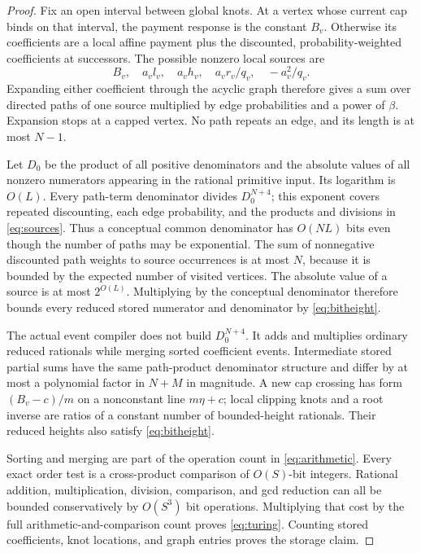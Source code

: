 \begin{proof}
Fix an open interval between global knots. At a vertex whose current cap binds on that interval, the payment response is the constant $B_v$. Otherwise its coefficients are a local affine payment plus the discounted, probability-weighted coefficients at successors. The possible nonzero local sources are
\begin{equation}\label{eq:sources}
 B_v,\quad a_vl_v,\quad a_vh_v,\quad a_vr_v/q_v,\quad -a_v^2/q_v.
\end{equation}
Expanding either coefficient through the acyclic graph therefore gives a sum over directed paths of one source multiplied by edge probabilities and a power of $\beta$. Expansion stops at a capped vertex. No path repeats an edge, and its length is at most $N-1$.

Let $D_0$ be the product of all positive denominators and the absolute values of all nonzero numerators appearing in the rational primitive input. Its logarithm is $O(L)$. Every path-term denominator divides $D_0^{N+4}$; this exponent covers repeated discounting, each edge probability, and the products and divisions in \eqref{eq:sources}. Thus a conceptual common denominator has $O(NL)$ bits even though the number of paths may be exponential. The sum of nonnegative discounted path weights to source occurrences is at most $N$, because it is bounded by the expected number of visited vertices. The absolute value of a source is at most $2^{O(L)}$. Multiplying by the conceptual denominator therefore bounds every reduced stored numerator and denominator by \eqref{eq:bitheight}.

The actual event compiler does not build $D_0^{N+4}$. It adds and multiplies ordinary reduced rationals while merging sorted coefficient events. Intermediate stored partial sums have the same path-product denominator structure and differ by at most a polynomial factor in $N+M$ in magnitude. A new cap crossing has form $(B_v-c)/m$ on a nonconstant line $m\eta+c$; local clipping knots and a root inverse are ratios of a constant number of bounded-height rationals. Their reduced heights also satisfy \eqref{eq:bitheight}.

Sorting and merging are part of the operation count in \eqref{eq:arithmetic}. Every exact order test is a cross-product comparison of $O(S)$-bit integers. Rational addition, multiplication, division, comparison, and gcd reduction can all be bounded conservatively by $O(S^3)$ bit operations. Multiplying that cost by the full arithmetic-and-comparison count proves \eqref{eq:turing}. Counting stored coefficients, knot locations, and graph entries proves the storage claim.
\end{proof}

